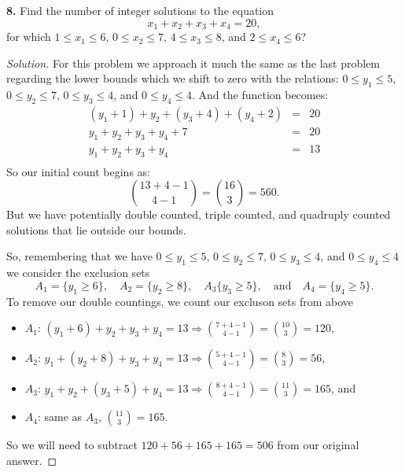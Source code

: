\documentclass[12pt]{amsart}
\newenvironment{solution}
{\begin{proof}[Solution]}
{\end{proof}}
\begin{document}
\begin{onehalfspace}
        \noindent\textbf{8.} Find the number of integer solutions to the equation
        \begin{displaymath}
            x_1 + x_2 + x_3 + x_4 = 20,
        \end{displaymath}
        for which $1\le x_1 \le 6$, $0 \le x_2 \le 7$, $4\le x_3 \le 8$, and $2 \le x_4 \le 6$?
        \begin{solution}
            For this problem we approach it much the same as the last problem regarding the
            lower bounds which we shift to zero with the relations: $0\le y_1\le 5$, $0\le y_2\le 7$,
            $0\le y_3\le 4$, and $0\le y_4\le 4$.
            And the function becomes:
            \begin{eqnarray*}
                (y_1 + 1) + y_2 + (y_3 + 4)  + (y_4 + 2) & = & 20\\
                y_1 + y_2 + y_3 + y_4 + 7 & = & 20\\
                y_1 + y_2 + y_3 + y_4 & = & 13\\
            \end{eqnarray*}
            So our initial count begins as:
            \begin{displaymath}
                \binom{13 + 4 - 1}{4 - 1} = \binom{16}{3} = 560.
            \end{displaymath}
            But we have potentially double counted, triple counted, and quadruply counted solutions
            that lie outside our bounds.

            So, remembering that we have $0\le y_1\le 5$, $0\le y_2\le 7$,
            $0\le y_3\le 4$, and $0\le y_4\le 4$ we consider the exclusion sets
            \begin{displaymath}
                A_1= \{y_1\ge 6\},\quad A_2=\{y_2\ge 8\},\quad A_3\{y_3\ge 5\},\quad\text{and}\quad A_4=\{y_4 \ge 5\}.
            \end{displaymath}
            To remove our double countings, we count our excluson sets from above
            \begin{itemize}
                \item[-] $A_1$: $(y_1 + 6) + y_2 + y_3 + y_4 = 13 \Rightarrow \binom{7+4-1}{4-1} = \binom{10}{3} = 120$,
                \item[-] $A_2$: $y_1 + (y_2 + 8) + y_3 + y_4 = 13 \Rightarrow \binom{5+4-1}{4-1} = \binom{8}{3} = 56$,
                \item[-] $A_3$: $y_1 + y_2 + (y_3+5) + y_4 = 13 \Rightarrow \binom{8+4-1}{4-1} = \binom{11}{3} = 165$, and
                \item[-] $A_4$: same as $A_3$, $\binom{11}{3} = 165$.
            \end{itemize}
            So we will need to subtract $120 + 56 + 165 + 165 = 506$ from our original answer.


\end{solution}
\end{onehalfspace}
\end{document}
